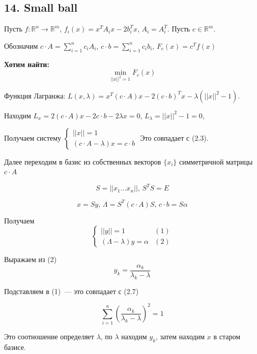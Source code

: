 \documentclass[a4paper]{article}
\begin{document}
\subsection*{14. Small ball}
Пусть $f\colon \mathbb{R}^n\to\mathbb{R}^m$, $f_i(x)=x^TA_ix-2b_i^Tx$, $A_i=A_i^T$. Пусть $c\in\mathbb{R}^m$.

Обозначим $c\cdot  A=\sum\limits_{i=1}^n c_iA_i$, $c\cdot b=\sum\limits_{i=1}^n c_ib_i$, $F_c(x)=c^Tf(x)$

{\bf Хотим найти:}
$$\min_{||x||^2=1}F_c(x)$$

Функция Лагранжа:
$L(x,\lambda)=x^T(c\cdot A)x-2(c\cdot b)^T x-\lambda(||x||^2-1)$.

Находим $L_x=2(c\cdot A)x-2c\cdot b-2\lambda x=0$, $L_\lambda=||x||^2-1=0$,

Получаем систему $\begin{cases}
||x||=1\\
(c\cdot A-\lambda)x=c\cdot b
\end{cases}$
Это совпадает с (2.3).

Далее переходим в базис из собственных векторов $\{x_i\}$ симметричной матрицы $c\cdot A$

$$S=||x_1...x_n||,\,S^TS=E$$

$$x=Sy,\,\Lambda=S^T(c\cdot A)S,\,c\cdot b=S\alpha$$

Получаем
$$\begin{cases}
||y||=1 &(1)\\
(\Lambda-\lambda)y=\alpha &(2)
\end{cases}
$$

Выражаем из (2) $$y_k=\frac{\alpha_k}{\lambda_k-\lambda}$$

Подставляем в (1)~--- это совпадает с (2.7)

$$\sum\limits_{i=1}^n (\frac{\alpha_k}{\lambda_k-\lambda})^2=1$$

Это соотношение определяет $\lambda$, по $\lambda$ находим $y_k$, затем находим $x$ в старом базисе.
\end{document}
